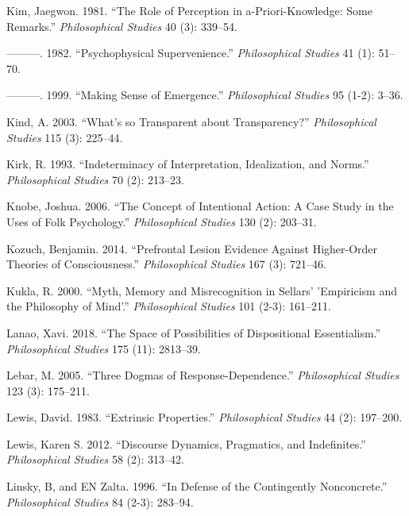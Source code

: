 \documentclass[
  10pt,
  letterpaper,
  DIV=11,
  numbers=noendperiod,
  twoside]{scrartcl}
\newlength{\cslhangindent}
\newenvironment{CSLReferences}[2] %
 {\begin{list}{}{%
  \setlength{\itemindent}{0pt}
  \setlength{\leftmargin}{0pt}
  \setlength{\parsep}{0pt}
  \ifodd #1
   \setlength{\leftmargin}{\cslhangindent}
   \setlength{\itemindent}{-1\cslhangindent}
  \fi
  \setlength{\itemsep}{#2\baselineskip}}}
 {\end{list}}
\begin{document}
\begin{CSLReferences}{1}{0}
Kim, Jaegwon. 1981. {``The Role of Perception in a-Priori-Knowledge:
Some Remarks.''} \emph{Philosophical Studies} 40 (3): 339--54.

---------. 1982. {``Psychophysical Supervenience.''} \emph{Philosophical
Studies} 41 (1): 51--70.

---------. 1999. {``Making Sense of Emergence.''} \emph{Philosophical
Studies} 95 (1-2): 3--36.

Kind, A. 2003. {``What's so Transparent about Transparency?''}
\emph{Philosophical Studies} 115 (3): 225--44.

Kirk, R. 1993. {``Indeterminacy of Interpretation, Idealization, and
Norms.''} \emph{Philosophical Studies} 70 (2): 213--23.

Knobe, Joshua. 2006. {``The Concept of Intentional Action: A Case Study
in the Uses of Folk Psychology.''} \emph{Philosophical Studies} 130 (2):
203--31.

Kozuch, Benjamin. 2014. {``Prefrontal Lesion Evidence Against
Higher-Order Theories of Consciousness.''} \emph{Philosophical Studies}
167 (3): 721--46.

Kukla, R. 2000. {``Myth, Memory and Misrecognition in Sellars'
'Empiricism and the Philosophy of Mind'.''} \emph{Philosophical Studies}
101 (2-3): 161--211.

Lanao, Xavi. 2018. {``The Space of Possibilities of Dispositional
Essentialism.''} \emph{Philosophical Studies} 175 (11): 2813--39.

Lebar, M. 2005. {``Three Dogmas of Response-Dependence.''}
\emph{Philosophical Studies} 123 (3): 175--211.

Lewis, David. 1983. {``Extrinsic Properties.''} \emph{Philosophical
Studies} 44 (2): 197--200.

Lewis, Karen S. 2012. {``Discourse Dynamics, Pragmatics, and
Indefinites.''} \emph{Philosophical Studies} 58 (2): 313--42.

Linsky, B, and EN Zalta. 1996. {``In Defense of the Contingently
Nonconcrete.''} \emph{Philosophical Studies} 84 (2-3): 283--94.


\end{CSLReferences}
\end{document}
